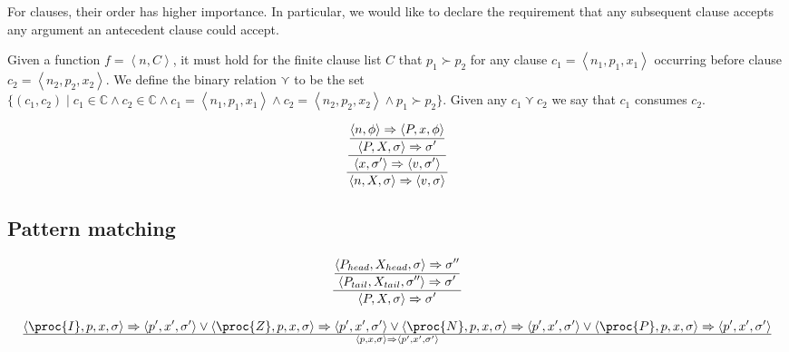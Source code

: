 For clauses, their order has higher importance. In particular, we would like to
declare the requirement that any subsequent clause accepts any argument an
antecedent clause could accept.

\begin{definition} Given a function $f= \left\langle n, C \right\rangle$, it
must hold for the finite clause list $C$ that $p_1\succ p_2$ for any clause
$c_1= \left\langle n_1, p_1, x_1 \right\rangle$ occurring before clause $c_2=
\left\langle n_2, p_2, x_2 \right\rangle$. We define the binary relation
$\curlyvee$ to be the set $\{(c_1,c_2)\mid c_1\in\mathbb{C} \wedge
c_2\in\mathbb{C} \wedge c_1= \left\langle n_1,p_1,x_1 \right\rangle \wedge c_2=
\left\langle n_2,p_2,x_2 \right\rangle \wedge p_1\succ p_2\}$. Given any
$c_1\curlyvee c_2$ we say that $c_1$ consumes $c_2$.\end{definition}

\begin{equation}
{\displaystyle
{\displaystyle
{\displaystyle
  \left\langle n, \phi\right\rangle
  \Rightarrow
  \left\langle P, x, \phi\right\rangle
\over\displaystyle
  \left\langle P, X, \sigma\right\rangle
  \Rightarrow
  \sigma'
}
\over\displaystyle
  \left\langle x, \sigma'\right\rangle
  \Rightarrow
  \left\langle v,\sigma'\right\rangle
}
\over\displaystyle
    \left\langle n,X,\sigma\right\rangle
    \Rightarrow
    \left\langle v,\sigma\right\rangle
}
\end{equation}

\subsection{Pattern matching}

\begin{equation}
{\displaystyle
{\displaystyle
  \left\langle P_{head}, X_{head}, \sigma\right\rangle
  \Rightarrow
  \sigma''
\over\displaystyle
  \left\langle P_{tail}, X_{tail}, \sigma''\right\rangle
  \Rightarrow
  \sigma'
}
\over\displaystyle
  \left\langle P, X, \sigma\right\rangle
  \Rightarrow
  \sigma'
}
\end{equation}

\begin{equation}
{
  \left\langle\proc{I}, p,x,\sigma\right\rangle
  \Rightarrow
  \left\langle p',x',\sigma'\right\rangle
\vee
  \left\langle\proc{Z}, p,x,\sigma\right\rangle
  \Rightarrow
  \left\langle p',x',\sigma'\right\rangle
\vee
  \left\langle\proc{N}, p,x,\sigma\right\rangle
  \Rightarrow
  \left\langle p',x',\sigma'\right\rangle
\vee
  \left\langle\proc{P}, p,x,\sigma\right\rangle
  \Rightarrow
  \left\langle p',x',\sigma'\right\rangle
}\over{
  \left\langle p, x, \sigma\right\rangle
  \Rightarrow
  \left\langle p', x', \sigma'\right\rangle
}
\end{equation}

